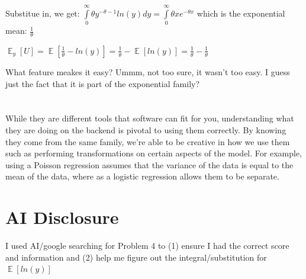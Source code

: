 \documentclass{article}
\DeclareMathOperator{\EX}{\mathbb{E}} %
\let\Oldint=\int
\renewcommand{\int}{\Oldint\limits}
\begin{document}
Substitue in, we get: $\int_{0}^\infty \theta y^{-\theta-1}ln(y) dy = \int_0^{\infty} \theta x e^{-\theta x}$ which is the exponential mean: $\frac{1}{\theta}$

$\EX_y[U] = \EX[\frac{1}{\theta} - ln(y)] = \frac{1}{\theta} - \EX[ln(y)] = \frac{1}{\theta} - \frac{1}{\theta}$

What feature meakes it easy? Ummm, not too sure, it wasn't too easy. I guess just the fact that it is part of the exponential family?


\section{}

While they are different tools that software can fit for you, understanding what they are doing on the backend is pivotal to using them correctly. By knowing they come from the same family, we're able to be creative in how we use them such as performing transformations on certain aspects of the model. For example, using a Poisson regression assumes that the variance of the data is equal to the mean of the data, where as a logistic regression allows them to be separate. 


\section{AI Disclosure}

I used AI/google searching for Problem 4 to (1) ensure I had the correct score and information and (2) help me figure out the integral/substitution for $\EX[ln(y)]$
\end{document}
